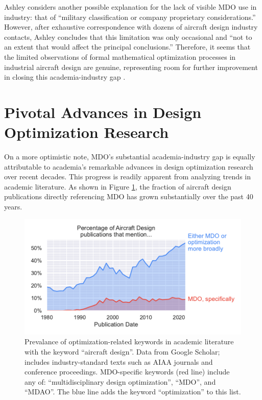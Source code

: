 Ashley considers another possible explanation for the lack of visible MDO use in industry: that of ``military classification or company proprietary considerations.'' \cite{ashley_making_1982} However, after exhaustive correspondence with dozens of aircraft design industry contacts, Ashley concludes that this limitation was only occasional and ``not to an extent that would affect the principal conclusions.'' Therefore, it seems that the limited observations of formal mathematical optimization processes in industrial aircraft design are genuine, representing room for further improvement in closing this academia-industry gap \cite{ciampa_3rd_2016, gazaix_industrialization_2017, piperni_development_2013, Shahpar_2011, vangent_knowledge_2020}.


\section{Pivotal Advances in Design Optimization Research}
\label{sec:literature_advances}

On a more optimistic note, MDO's substantial academia-industry gap is equally attributable to academia's remarkable advances in design optimization research over recent decades. This progress is readily apparent from analyzing trends in academic literature. As shown in Figure \ref{fig:mdo_citation_counts}, the fraction of aircraft design publications directly referencing MDO has grown substantially over the past 40 years.

\begin{figure}[H]
    \centering
    \includegraphics{../figures/mdo_citation_counts}
    \caption{Prevalance of optimization-related keywords in academic literature with the keyword ``aircraft design''. Data from Google Scholar; includes industry-standard texts such as AIAA journals and conference proceedings. MDO-specific keywords (red line) include any of: ``multidisciplinary design optimization'', ``MDO'', and ``MDAO''. The blue line adds the keyword ``optimization'' to this list.}
    \label{fig:mdo_citation_counts}
\end{figure}

